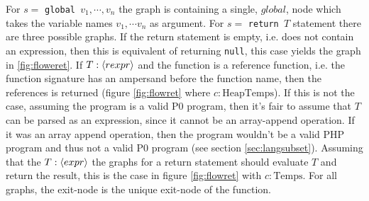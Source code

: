 \begin{figure}
{\begin{adjustbox}{max size={.25\textwidth}{.25\textheight}}
\end{adjustbox}}\hfill%
\hspace*{\fill}
\end{figure}

For $s =$ \texttt{global $v_1,\cdots, v_n$} the graph is containing a single, $global$, node which takes the variable names $v_1,\cdots v_n$ as argument. For $s =$ \texttt{return $T$} statement there are three possible graphs. If the return statement is empty, i.e. does not contain an expression, then this is equivalent of returning \texttt{null}, this case yields the graph in \ref{fig:floweret}. If $T : \langle rexpr\rangle$ and the function is a reference function, i.e. the function signature has an ampersand before the function name, then the references is returned (figure \ref{fig:flowret} where $c : \text{HeapTemps}$). If this is not the case, assuming the program is a valid P0 program, then it's fair to assume that $T$ can be parsed as an expression, since it cannot be an array-append operation. If it was an array append operation, then the program wouldn't be a valid PHP program and thus not a valid P0 program (see section \ref{sec:langsubset}). Assuming that the $T : \langle expr\rangle$ the graphs for a return statement should evaluate $T$ and return the result, this is the case in figure \ref{fig:flowret} with $c : \text{Temps}$. For all graphs, the exit-node is the unique exit-node of the function.

